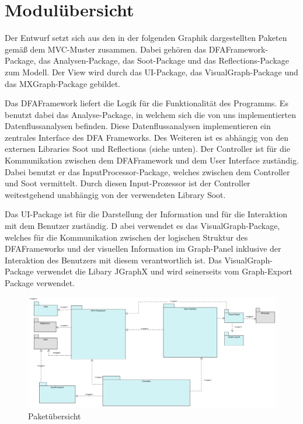 \section{Modulübersicht}
Der Entwurf setzt sich aus den in der folgenden Graphik dargestellten Paketen gemäß dem MVC-Muster zusammen.
Dabei gehören das DFAFramework-Package, das Analysen-Package, das Soot-Package und das Reflections-Package zum Modell. 
Der View wird durch das UI-Package, das VisualGraph-Package und das MXGraph-Package gebildet. \par
Das DFAFramework liefert die Logik für die Funktionalität des Programms. 
Es benutzt dabei das Analyse-Package, in welchem sich die von uns implementierten Datenflussanalysen befinden. 
Diese Datenflussanalysen implementieren ein zentrales Interface des DFA Frameworks. 
Des Weiteren ist es abhängig von den externen Libraries Soot und Reflections (siehe unten). 
Der Controller ist für die Kommunikation zwischen dem DFAFramework und dem User Interface zuständig. 
Dabei benutzt er das InputProcessor-Package, welches zwischen dem Controller und Soot vermittelt. 
Durch diesen Input-Prozessor ist der Controller weitestgehend unabhängig von der verwendeten Library Soot. \par 
Das UI-Package ist für die Darstellung der Information und für die Interaktion mit dem Benutzer zuständig. D
abei verwendet es das VisualGraph-Package, welches für die Kommunikation zwischen der logischen Struktur des DFAFrameworks und der visuellen Information im Graph-Panel inklusive der Interaktion des Benutzers mit diesem verantwortlich ist. 
Das VisualGraph-Package verwendet die Libary JGraphX und wird seinerseits vom Graph-Export Package verwendet. 

\begin{figure}[htbp] 
  \centering
     \includegraphics[width=1\textwidth]{Entwurfsentscheidungen/PackageOverview}
  \caption{Paketübersicht}
  \label{fig:Ubersicht}
\end{figure}

